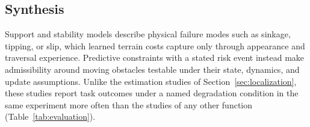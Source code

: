 \subsection{Synthesis}

Support and stability models describe physical failure modes such as sinkage, tipping, or slip, which learned terrain costs capture only through appearance and traversal experience. Predictive constraints with a stated risk event instead make admissibility around moving obstacles testable under their state, dynamics, and update assumptions. Unlike the estimation studies of Section~\ref{sec:localization}, these studies report task outcomes under a named degradation condition in the same experiment more often than the studies of any other function (Table~\ref{tab:evaluation}).

